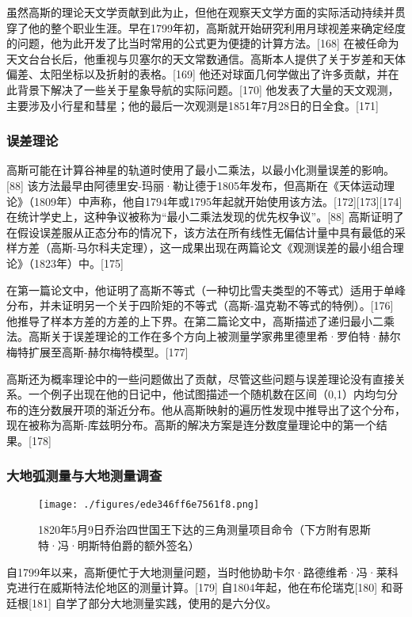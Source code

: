 虽然高斯的理论天文学贡献到此为止，但他在观察天文学方面的实际活动持续并贯穿了他的整个职业生涯。早在1799年初，高斯就开始研究利用月球视差来确定经度的问题，他为此开发了比当时常用的公式更为便捷的计算方法。[168] 在被任命为天文台台长后，他重视与贝塞尔的天文常数通信。高斯本人提供了关于岁差和天体偏差、太阳坐标以及折射的表格。[169] 他还对球面几何学做出了许多贡献，并在此背景下解决了一些关于星象导航的实际问题。[170] 他发表了大量的天文观测，主要涉及小行星和彗星；他的最后一次观测是1851年7月28日的日全食。[171]
\subsubsection{误差理论}  
高斯可能在计算谷神星的轨道时使用了最小二乘法，以最小化测量误差的影响。[88] 该方法最早由阿德里安-玛丽·勒让德于1805年发布，但高斯在《天体运动理论》（1809年）中声称，他自1794年或1795年起就开始使用该方法。[172][173][174] 在统计学史上，这种争议被称为“最小二乘法发现的优先权争议”。[88] 高斯证明了在假设误差服从正态分布的情况下，该方法在所有线性无偏估计量中具有最低的采样方差（高斯-马尔科夫定理），这一成果出现在两篇论文《观测误差的最小组合理论》（1823年）中。[175]  

在第一篇论文中，他证明了高斯不等式（一种切比雪夫类型的不等式）适用于单峰分布，并未证明另一个关于四阶矩的不等式（高斯-温克勒不等式的特例）。[176] 他推导了样本方差的方差的上下界。在第二篇论文中，高斯描述了递归最小二乘法。高斯关于误差理论的工作在多个方向上被测量学家弗里德里希·罗伯特·赫尔梅特扩展至高斯-赫尔梅特模型。[177]

高斯还为概率理论中的一些问题做出了贡献，尽管这些问题与误差理论没有直接关系。一个例子出现在他的日记中，他试图描述一个随机数在区间（0,1）内均匀分布的连分数展开项的渐近分布。他从高斯映射的遍历性发现中推导出了这个分布，现在被称为高斯-库兹明分布。高斯的解决方案是连分数度量理论中的第一个结果。[178]
\subsubsection{大地弧测量与大地测量调查}
\begin{figure}[ht]
\centering
\texttt{[image: ./figures/ede346ff6e7561f8.png]}
\caption{1820年5月9日乔治四世国王下达的三角测量项目命令（下方附有恩斯特·冯·明斯特伯爵的额外签名）} \label{fig_KRGS_16}
\end{figure}
自1799年以来，高斯便忙于大地测量问题，当时他协助卡尔·路德维希·冯·莱科克进行在威斯特法伦地区的测量计算。[179] 自1804年起，他在布伦瑞克[180] 和哥廷根[181] 自学了部分大地测量实践，使用的是六分仪。

